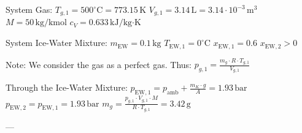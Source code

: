 System Gas:  
\( T_{g,1} = 500^\circ \text{C} = 773.15 \, \text{K} \)  
\( V_{g,1} = 3.14 \, \text{L} = 3.14 \cdot 10^{-3} \, \text{m}^3 \)  
\( M = 50 \, \text{kg/kmol} \)  
\( c_V = 0.633 \, \text{kJ/kg·K} \)  

System Ice-Water Mixture:  
\( m_{\text{EW}} = 0.1 \, \text{kg} \)  
\( T_{\text{EW},1} = 0^\circ \text{C} \)  
\( x_{\text{EW},1} = 0.6 \)  
\( x_{\text{EW},2} > 0 \)  

Note:  
We consider the gas as a perfect gas.  
Thus:  
\( p_{g,1} = \frac{m_g \cdot R \cdot T_{g,1}}{V_{g,1}} \)  

Through the Ice-Water Mixture:  
\( p_{\text{EW},1} = p_{\text{amb}} + \frac{m_K \cdot g}{A} = 1.93 \, \text{bar} \)  
\( p_{\text{EW},2} = p_{\text{EW},1} = 1.93 \, \text{bar} \)  
\( m_g = \frac{p_{g,1} \cdot V_{g,1} \cdot M}{R \cdot T_{g,1}} = 3.42 \, \text{g} \)  

---